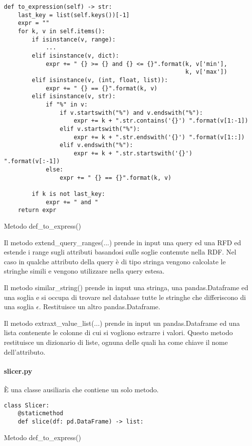 \begin{listing}[H]
\begin{verbatim}
def to_expression(self) -> str:
    last_key = list(self.keys())[-1]
    expr = ""
    for k, v in self.items():
        if isinstance(v, range):
            ...
        elif isinstance(v, dict):
            expr += " {} >= {} and {} <= {}".format(k, v['min'],
                                                    k, v['max'])
        elif isinstance(v, (int, float, list)):
            expr += " {} == {}".format(k, v)
        elif isinstance(v, str):
            if "%" in v:
                if v.startswith("%") and v.endswith("%"):
                    expr += k + ".str.contains('{}') ".format(v[1:-1])
                elif v.startswith("%"):
                    expr += k + ".str.endswith('{}') ".format(v[1::])
                elif v.endswith("%"):
                    expr += k + ".str.startswith('{}') ".format(v[:-1])
            else:
                expr += " {} == {}".format(k, v)

        if k is not last_key:
            expr += " and "
    return expr
\end{verbatim}
\caption{Metodo def{\_}to{\_}express()}
\label{Code:9}
\end{listing}

Il metodo extend{\_}query{\_}ranges(...) prende in input una query ed una RFD ed estende i range sugli attributi basandosi sulle soglie contenute nella RDF. Nel caso in qualche attributo della query è di tipo stringa vengono calcolate le stringhe simili e vengono utilizzare nella query estesa.

Il metodo similar{\_}string() prende in input una stringa, una pandas.Dataframe ed una soglia e si occupa di trovare nel database tutte le stringhe che differiscono di una soglia $\epsilon$. Restituisce un altro pandas.Dataframe.

Il metodo extraxt{\_}value{\_}list(...) prende in input un pandas.Dataframe ed una lista contenente le colonne di cui si vogliono estrarre i valori. Questo metodo restituisce un dizionario di liste, ognuna delle quali ha come chiave il nome dell'attributo.

\paragraph{slicer.py}
È una classe ausiliaria che contiene un solo metodo.
\begin{listing}[H]
\begin{verbatim}
class Slicer:
    @staticmethod
    def slice(df: pd.DataFrame) -> list:
\end{verbatim}
\caption{Metodo def{\_}to{\_}express()}
\label{Code:14}
\end{listing}

